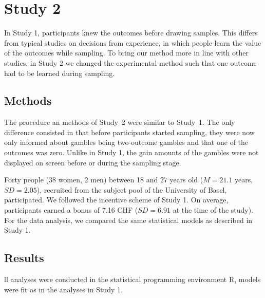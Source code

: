 \documentclass[a4paper, man, natbib, floatsintext]{apa6} %
\begin{document}
\section{Study 2}
In Study 1, participants knew the outcomes before drawing samples. This differs from typical studies on decisions from experience, in which people learn the value of the outcomes while sampling. To bring our method more in line with other studies, in Study 2 we changed the experimental method such that one outcome had to be learned during sampling.

\subsection{Methods}
The procedure an methods of Study~2 were similar to Study~1. The only difference consisted in that before participants started sampling, they were now only informed about gambles being two-outcome gambles and that one of the outcomes was zero. Unlike in Study 1, the gain amounts of the gambles were not displayed on screen before or during the sampling stage.

Forty people (38 women, 2 men) between 18 and 27 years old ($M = 21.1$ years, $SD = 2.05$), recruited from the subject pool of the University of Basel, participated. We followed the incentive scheme of Study 1. On average, participants earned a bonus of 7.16 CHF ($SD = 6.91$ at the time of the study). For the data analysis, we compared the same statistical models as described in Study 1.

\subsection{Results}
ll analyses were conducted in the statistical programming environment R, models were fit as in the analyses in Study 1.

\end{document}
